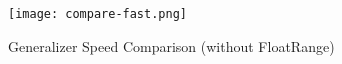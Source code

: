 \begin{figure}[H]
    \centering
    \texttt{[image: compare-fast.png]}
    \caption{Generalizer Speed Comparison (without FloatRange)}\label{fig:compare_fast}
\end{figure}